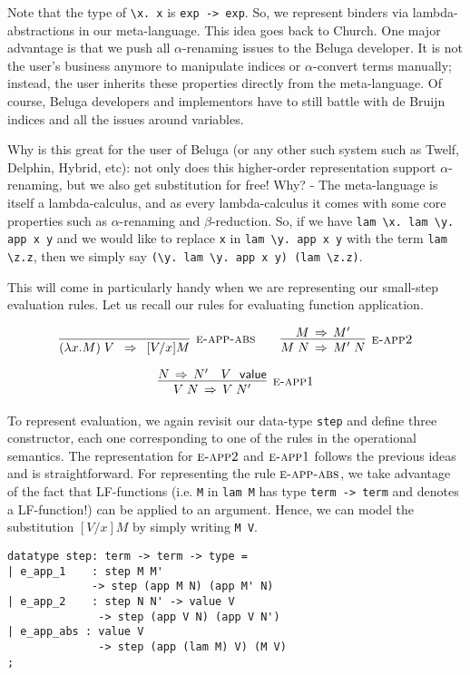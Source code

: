 Note that the type of \lstinline!\x. x! is \lstinline!exp -> exp!. So,
we represent binders  via lambda-abstractions in our
meta-language. This idea goes back to Church. One major advantage is
that we push all $\alpha$-renaming issues to the Beluga developer. It
is not the user's business anymore to manipulate indices or
$\alpha$-convert terms manually; instead, the user inherits these
properties directly from the meta-language. Of course, Beluga developers and
implementors have to still battle with de Bruijn indices and all the issues
around variables.

Why is this great for the user of Beluga (or any other such system such as Twelf, Delphin, Hybrid, etc): not only does this higher-order representation support $\alpha$-renaming, but we also get substitution for free! Why?  - The meta-language is itself a lambda-calculus, and as every lambda-calculus it comes with some core properties such as $\alpha$-renaming and $\beta$-reduction. So, if we
have \lstinline!lam \x. lam \y. app x y! and we would like to replace
\lstinline!x! in \lstinline!lam \y. app x y! with the term
\lstinline!lam \z.z!, then we simply say
\lstinline!(\y. lam \y. app x y) (lam \z.z)!.

This will come in particularly handy when we are representing our small-step
evaluation rules. Let us recall our rules for evaluating function application.

\[
\begin{array}{c}
\infer[\SAppBeta]{(\lambda x.M)\;V ~\step~ [V/x]M}{} \qquad
\infer[\SAppArgStep]{M\;N \step M'\;N}{M \step M'} \\[1em]
\infer[\SAppFnStep]{V\;N \step V\;N'}{N \step N' & V~\isv}
\end{array}
\]

To represent evaluation, we again revisit our data-type
\lstinline!step! and define three constructor, each one corresponding to one of
the rules in the operational semantics. The representation for $\textsc{e-app2}$
and $\textsc{e-app1}$ follows the previous ideas and is straightforward. For
representing the rule $\textsc{e-app-abs}$, we take advantage of the fact that
LF-functions (i.e. \lstinline!M! in \lstinline!lam M! has type
\lstinline!term -> term! and denotes a LF-function!) can be applied to an
argument. Hence, we can model the substitution $[V/x]M$ by simply writing
\lstinline!M V!.

\begin{lstlisting}
datatype step: term -> term -> type =
| e_app_1    : step M M'
             -> step (app M N) (app M' N)
| e_app_2    : step N N' -> value V
              -> step (app V N) (app V N')
| e_app_abs : value V
              -> step (app (lam M) V) (M V)
;
\end{lstlisting}

